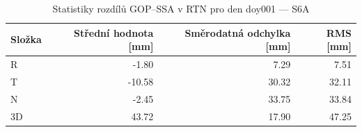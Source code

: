 \begin{table}[H]
\centering
\caption{Statistiky rozdílů GOP–SSA v RTN pro den doy001 — S6A}
\label{tab:s6_ZAZG_doy001_day_stats}
\begin{tabular}{lrrr}
\toprule
Složka & Střední hodnota [mm] & Směrodatná odchylka [mm] & RMS [mm] \\
\midrule
R & -1.80 & 7.29 & 7.51 \\
T & -10.58 & 30.32 & 32.11 \\
N & -2.45 & 33.75 & 33.84 \\
3D & 43.72 & 17.90 & 47.25 \\
\bottomrule
\end{tabular}
\end{table}

